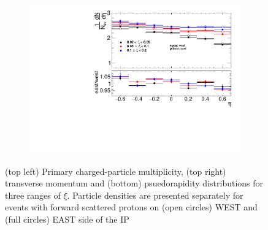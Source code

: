 \begin{figure}[h!]
\begin{subfigure}{.49\textwidth}
		\includegraphics[width=\textwidth,page=1]{chapters/chrgSTAR/img/eastWest/eta_test.pdf}
	\end{subfigure}
	\begin{minipage}{.49\textwidth}
		\caption{(top left) Primary charged-particle multiplicity, (top right) transverse momentum and (bottom) psuedorapidity distributions for three ranges of $\xi$. Particle densities are presented separately for events with forward scattered protons on (open circles) WEST and (full circles) EAST side of the IP}
		\label{fig:eastWest_star}
	\end{minipage}
	
\end{figure}